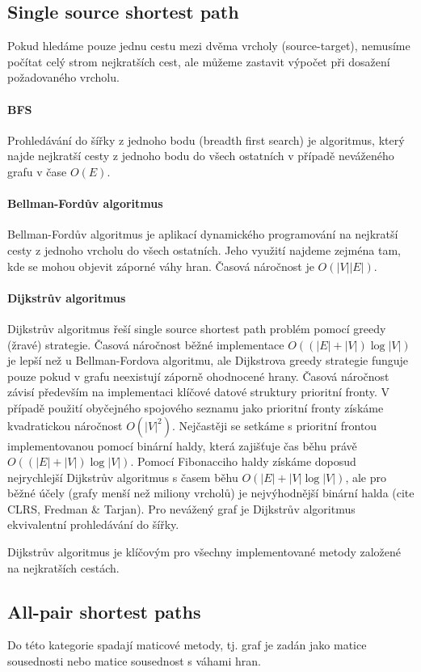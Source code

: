 \documentclass[12pt,titlepage]{report}
\begin{document}
\subsection{Single source shortest path}
Pokud hledáme pouze jednu cestu mezi dvěma vrcholy (source-target), nemusíme
počítat celý strom nejkratších cest, ale můžeme zastavit výpočet při dosažení
požadovaného vrcholu. 

\paragraph{BFS}
Prohledávání do šířky z jednoho bodu (breadth first search) je algoritmus,
který najde nejkratší cesty z jednoho bodu do všech ostatních v případě
neváženého grafu v čase $O(E)$.

\paragraph{Bellman-Fordův algoritmus}
Bellman-Fordův algoritmus je aplikací dynamického programování na nejkratší
cesty z jednoho vrcholu do všech ostatních. Jeho využití najdeme zejména tam,
kde se mohou objevit záporné váhy hran. Časová náročnost je $O(|V||E|)$.

\paragraph{Dijkstrův algoritmus}
Dijkstrův algoritmus řeší single source shortest path problém pomocí greedy
(žravé) strategie. Časová náročnost běžné implementace $O((|E| + |V|)\log|V|)$
je lepší než u Bellman-Fordova algoritmu, ale Dijkstrova greedy strategie
funguje pouze pokud v grafu neexistují záporně ohodnocené hrany. Časová
náročnost závisí především na implementaci klíčové datové struktury prioritní
fronty. V případě použití obyčejného spojového seznamu jako prioritní fronty
získáme kvadratickou náročnost $O(|V|^2)$. Nejčastěji se setkáme s prioritní
frontou implementovanou pomocí binární haldy, která zajišťuje čas běhu právě
$O((|E| + |V|)\log|V|)$. Pomocí Fibonacciho haldy získáme doposud nejrychlejší
Dijkstrův algoritmus s časem běhu $O(|E| + |V| \log|V|)$, ale pro běžné účely
(grafy menší než miliony vrcholů) je nejvýhodnější binární halda (cite CLRS,
Fredman \& Tarjan). Pro nevážený graf je Dijkstrův algoritmus ekvivalentní
prohledávání do šířky.

Dijkstrův algoritmus je klíčovým pro všechny implementované metody založené na
nejkratších cestách.

\subsection{All-pair shortest paths}
Do této kategorie spadají maticové metody, tj. graf je zadán jako matice
sousednosti nebo matice sousednost s váhami hran.
\end{document}
